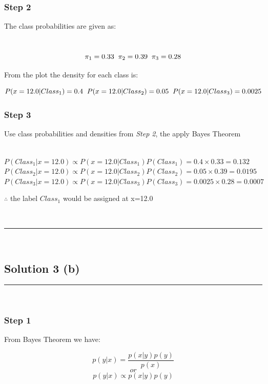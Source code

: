 \documentclass{article}
\begin{document}
\subsubsection*{Step 2}
\parbox{\textwidth}{The class probabilities are given as: }\\
$$\pi_1 = 0.33 \hspace{0.2cm} \pi_2 = 0.39 \hspace{0.2cm} \pi_3 = 0.28$$
\parbox{\textwidth}{From the plot the density for each class is:}
$$P(x=12.0|Class_1) = 0.4 \hspace{0.2cm} P(x=12.0|Class_2) = 0.05 \hspace{0.2cm} P(x=12.0|Class_3) = 0.0025$$

\subsubsection*{Step 3}

\parbox{\textwidth}{Use class probabilities and densities from \textit{Step 2}, the apply Bayes Theorem}\\

$P(Class_1|x=12.0) \propto P(x=12.0|Class_1)P(Class_1) = 0.4 \times 0.33 = 0.132$\\

$P(Class_2|x=12.0) \propto P(x=12.0|Class_2)P(Class_2) = 0.05 \times 0.39 = 0.0195$\\

$P(Class_3|x=12.0) \propto P(x=12.0|Class_3)P(Class_3) = 0.0025 \times 0.28 = 0.0007$\\

\parbox{\textwidth}{$\therefore$ the label $Class_1$ would be assigned at x=12.0}\\

\noindent\rule{\textwidth}{0.4pt}\\

\newpage

\subsection*{Solution 3 (b)}

\noindent\rule{\textwidth}{0.4pt}\\

\subsubsection*{Step 1}
\parbox{\textwidth}{From Bayes Theorem we have:}
$$p(y|x) = \frac{p(x|y)p(y)}{p(x)}$$
$$or$$
$$p(y|x) \propto p(x|y)p(y)$$
\end{document}
